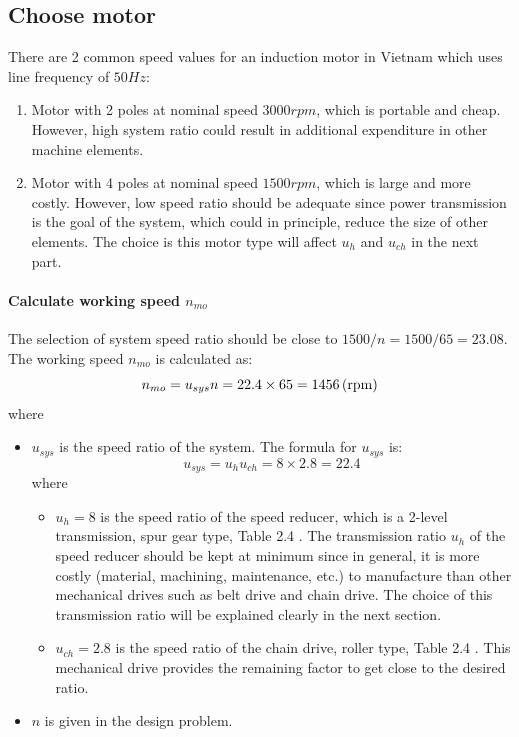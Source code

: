 \subsection{Choose motor}
There are 2 common speed values for an induction motor in Vietnam which uses line frequency of $ 50\unit{Hz} $:
\begin{enumerate}
	\item Motor with 2 poles at nominal speed $ 3000\unit{rpm} $, which is portable and cheap. However, high system ratio could result in additional expenditure in other machine elements.
	\item Motor with 4 poles at nominal speed $ 1500\unit{rpm} $, which is large and more costly. However, low speed ratio should be adequate since power transmission is the goal of the system, which could in principle, reduce the size of other elements. The choice is this motor type will affect $ u_h $ and $ u_{ch} $ in the next part.
\end{enumerate}

\paragraph{Calculate working speed $ n_{mo} $}
The selection of system speed ratio should be close to $ 1500/n=1500/65= 23.08 $. The working speed $ n_{mo} $ is calculated as:
\[ n_{mo} = u_{sys}n = 22.4 \times 65 = 1456 \, (\mathrm{rpm})\]
where
\begin{itemize}
	\item $ u_{sys} $ is the speed ratio of the system. The formula for $ u_{sys} $ is:
	\[ u_{sys} = u_hu_{ch} = 8 \times 2.8 = 22.4\]
	where
	\begin{itemize}
		\item $ u_h = 8 $ is the speed ratio of the speed reducer, which is a 2-level transmission, spur gear type, Table 2.4 \cite{tk1}. The transmission ratio $ u_h $ of the speed reducer should be kept at minimum since in general, it is more costly (material, machining, maintenance, etc.) to manufacture than other mechanical drives such as belt drive and chain drive. The choice of this transmission ratio will be explained clearly in the next section.
		\item $ u_{ch} = 2.8$ is the speed ratio of the chain drive, roller type, Table 2.4 \cite{tk1}. This mechanical drive provides the remaining factor to get close to the desired ratio.
	\end{itemize}
	\item $ n $ is given in the design problem.
\end{itemize}

